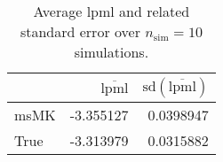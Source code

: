 \begin{table}[H]

\caption{Average lpml and related standard error over $n_{\text{sim}} = 10$ simulations.}
\centering
\begin{tabular}[t]{lrr}
\toprule
  & $\overbar{\text{lpml}}$ & $\text{sd}(\overbar{\text{lpml}})$\\
\midrule
msMK & -3.355127 & 0.0398947\\
True & -3.313979 & 0.0315882\\
\bottomrule
\end{tabular}
\end{table}